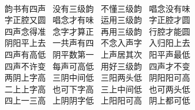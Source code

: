 {\hei 
\\
\hspace*{50pt}~ 韵书有四声~\hspace{40pt} 没有三级韵~\hspace{40pt} 不懂三级韵~\hspace{40pt} 唱念没有味\\ 
\hspace*{50pt}~ 字正腔又圆~\hspace{40pt} 唱念才有味~\hspace{40pt} 运用三级韵~\hspace{40pt} 字正腔才圆\\ 
\hspace*{50pt}~ 四声念得准~\hspace{40pt} 念字才算正~\hspace{40pt} 再用三级韵~\hspace{40pt} 行腔才能圆\\
\hspace*{50pt}~ 阴阳平上去~\hspace{40pt} 一共声有四~\hspace{40pt} 不念入声字~\hspace{40pt} 入归阳上去\\
\hspace*{50pt}~ 四声有高低~\hspace{40pt} 阴平数第一~\hspace{40pt} 上声居其次~\hspace{40pt} 阳平声最低\\
\hspace*{50pt}~ 四声不许变~\hspace{40pt} 每声可高低~\hspace{40pt} 用好三级韵~\hspace{40pt} 四声才不变\\
\hspace*{50pt}~ 两阴上字高~\hspace{40pt} 三阴中间低~\hspace{40pt} 三阳两头低~\hspace{40pt} 阴阳阳可高\\
\hspace*{50pt}~ 二上上字高~\hspace{40pt} 也可下字高~\hspace{40pt} 三上中间低~\hspace{40pt} 也可两头低\\
\hspace*{50pt}~ 四上一三高~\hspace{40pt} 上阴阴字低~\hspace{40pt} 上阳阳可高~\hspace{40pt} 阴上都可低\\
}
